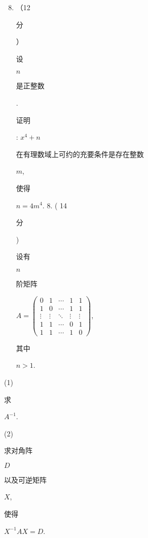 \documentclass[10pt]{article}
\begin{document}
\begin{enumerate}
  \setcounter{enumi}{7}
  \item （12 \begin{CJK}{UTF8}{mj}分\end{CJK}）\begin{CJK}{UTF8}{mj}设\end{CJK} $n$ \begin{CJK}{UTF8}{mj}是正整数\end{CJK}. \begin{CJK}{UTF8}{mj}证明\end{CJK}: $x^{4}+n$ \begin{CJK}{UTF8}{mj}在有理数域上可约的充要条件是存在整数\end{CJK} $m$, \begin{CJK}{UTF8}{mj}使得\end{CJK} $n=4 m^{4}$. 8. ( 14 \begin{CJK}{UTF8}{mj}分\end{CJK}) \begin{CJK}{UTF8}{mj}设有\end{CJK} $n$ \begin{CJK}{UTF8}{mj}阶矩阵\end{CJK} $A=\left(\begin{array}{ccccc}0 & 1 & \cdots & 1 & 1 \\ 1 & 0 & \cdots & 1 & 1 \\ \vdots & \vdots & \ddots & \vdots & \vdots \\ 1 & 1 & \cdots & 0 & 1 \\ 1 & 1 & \cdots & 1 & 0\end{array}\right)$, \begin{CJK}{UTF8}{mj}其中\end{CJK} $n>1$.
\end{enumerate}
(1) \begin{CJK}{UTF8}{mj}求\end{CJK} $A^{-1}$.

(2) \begin{CJK}{UTF8}{mj}求对角阵\end{CJK} $D$ \begin{CJK}{UTF8}{mj}以及可逆矩阵\end{CJK} $X$, \begin{CJK}{UTF8}{mj}使得\end{CJK} $X^{-1} A X=D$.
\end{document}
